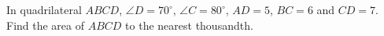 In quadrilateral $ABCD$, $\angle D=70^\circ$, $\angle C=80^\circ$, $AD=5$, $BC=6$ and $CD=7$. Find the area of $ABCD$ to the nearest thousandth.
